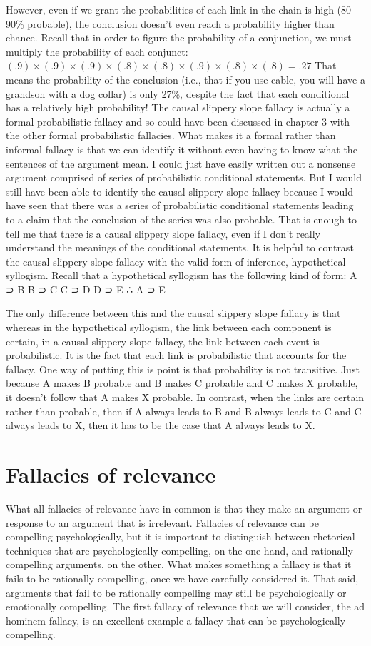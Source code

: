 However, even if we grant the probabilities of each link in the chain is high (80-
90\% probable), the conclusion doesn't even reach a probability higher than
chance. Recall that in order to figure the probability of a conjunction, we must
multiply the probability of each conjunct:
$(.9) \times (.9) \times (.9) \times (.8) \times (.8) \times (.9) \times (.8) \times (.8) = .27$
That means the probability of the conclusion (i.e., that if you use cable, you will
have a grandson with a dog collar) is only 27\%, despite the fact that each
conditional has a relatively high probability! The causal slippery slope fallacy is
actually a formal probabilistic fallacy and so could have been discussed in
chapter 3 with the other formal probabilistic fallacies. What makes it a formal
rather than informal fallacy is that we can identify it without even having to know
what the sentences of the argument mean. I could just have easily written out a
nonsense argument comprised of series of probabilistic conditional statements.
But I would still have been able to identify the causal slippery slope fallacy
because I would have seen that there was a series of probabilistic conditional
statements leading to a claim that the conclusion of the series was also probable.
That is enough to tell me that there is a causal slippery slope fallacy, even if I
don't really understand the meanings of the conditional statements.
It is helpful to contrast the causal slippery slope fallacy with the valid form of
inference, hypothetical syllogism. Recall that a hypothetical syllogism has the
following kind of form:
A ⊃ B
B ⊃ C
C ⊃ D
D ⊃ E
∴ A ⊃ E

The only difference between this and the causal slippery slope fallacy is that
whereas in the hypothetical syllogism, the link between each component is
certain, in a causal slippery slope fallacy, the link between each event is
probabilistic. It is the fact that each link is probabilistic that accounts for the
fallacy. One way of putting this is point is that probability is not transitive. Just
because A makes B probable and B makes C probable and C makes X probable,
it doesn't follow that A makes X probable. In contrast, when the links are certain
rather than probable, then if A always leads to B and B always leads to C and C
always leads to X, then it has to be the case that A always leads to X.

\section{Fallacies of relevance}
What all fallacies of relevance have in common is that they make an argument or
response to an argument that is irrelevant. Fallacies of relevance can be
compelling psychologically, but it is important to distinguish between rhetorical
techniques that are psychologically compelling, on the one hand, and rationally
compelling arguments, on the other. What makes something a fallacy is that it
fails to be rationally compelling, once we have carefully considered it. That said,
arguments that fail to be rationally compelling may still be psychologically or
emotionally compelling. The first fallacy of relevance that we will consider, the
ad hominem fallacy, is an excellent example a fallacy that can be psychologically
compelling.

